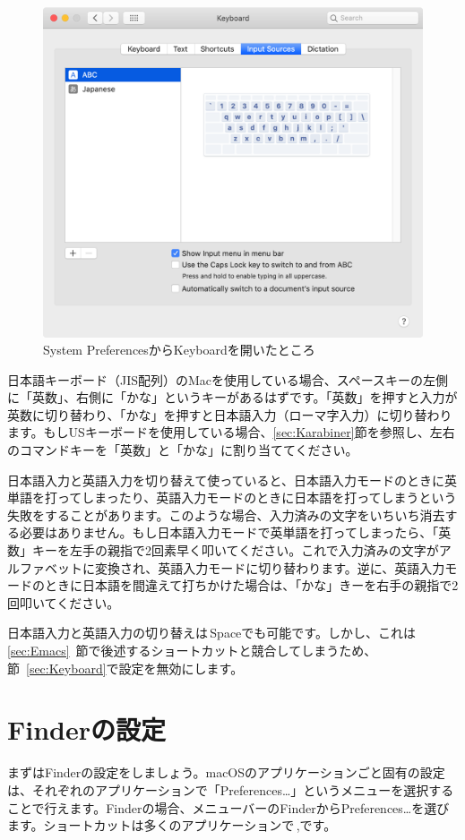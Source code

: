 \begin{figure}
  \centering
  \includegraphics[scale=0.35]{fig/SystemPreferences_input.png}
  \caption{System PreferencesからKeyboardを開いたところ}
  \label{fig:SystemPreferences_input}
\end{figure}

日本語キーボード（JIS配列）のMacを使用している場合、スペースキーの左側に「英数」、右側に「かな」というキーがあるはずです。「英数」を押すと入力が英数に切り替わり、「かな」を押すと日本語入力（ローマ字入力）に切り替わります。もしUSキーボードを使用している場合、\ref{sec:Karabiner}節を参照し、左右のコマンドキーを「英数」と「かな」に割り当ててください。

日本語入力と英語入力を切り替えて使っていると、日本語入力モードのときに英単語を打ってしまったり、英語入力モードのときに日本語を打ってしまうという失敗をすることがあります。このような場合、入力済みの文字をいちいち消去する必要はありません。もし日本語入力モードで英単語を打ってしまったら、「英数」キーを左手の親指で2回素早く叩いてください。これで入力済みの文字がアルファベットに変換され、英語入力モードに切り替わります。逆に、英語入力モードのときに日本語を間違えて打ちかけた場合は、「かな」きーを右手の親指で2回叩いてください。

日本語入力と英語入力の切り替えは\ctlkey\,Spaceでも可能です。しかし、これは\ref{sec:Emacs}~節で後述するショートカットと競合してしまうため、節~\ref{sec:Keyboard}で設定を無効にします。

\section{Finderの設定}
まずはFinderの設定をしましょう。macOSのアプリケーションごと固有の設定は、それぞれのアプリケーションで「Preferences…」というメニューを選択することで行えます。Finderの場合、メニューバーのFinderからPreferences…を選びます。ショートカットは多くのアプリケーションで\cmdkey\,,です。

